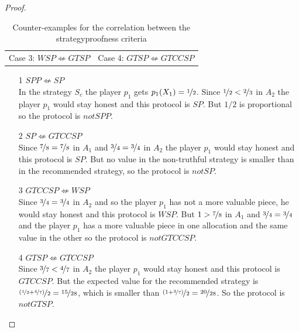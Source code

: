 \begin{proof}
\begin{table}[htb]
\begin{tabular}{cc}
Case 3: $WSP \not\Leftarrow GTSP$& Case 4: $GTSP \not\Leftarrow GTCCSP$
\end{tabular}
\caption{Counter-examples for the correlation between the strategyproofness criteria}\label{234}
\end{table}
\newpage
\begin{enumerate}
\item[1] $SPP \not\Leftarrow SP$\\
In the strategy $S_c$ the player $p_1$ gets $p_1(X_1)=\nicefrac{1}{2}$. Since $\nicefrac{1}{2} < \nicefrac{2}{3}$ in $A_2$ the player $p_1$ would stay honest and this protocol is $SP$. But $1/2$ is proportional so the protocol is $notSPP$. 
\item[2] $SP \not\Leftarrow GTCCSP$\\Since $\nicefrac{7}{8} = \nicefrac{7}{8}$ in $A_1$ and $\nicefrac{3}{4} = \nicefrac{3}{4}$ in $A_2$ the player $p_1$ would stay honest and this protocol is $SP$. But no value in the non-truthful strategy is smaller than in the recommended strategy, so the protocol is $notSP$.
\item[3] $GTCCSP \not\Leftarrow WSP$\\
Since $\nicefrac{3}{4} = \nicefrac{3}{4}$ in $A_2$ and so the player $p_1$ has not a more valuable piece, he would stay honest and this protocol is $WSP$. But $1 > \nicefrac{7}{8}$ in $A_1$ and $\nicefrac{3}{4} = \nicefrac{3}{4}$ and the player $p_1$ has a more valuable piece in one allocation and the same value in the other so the protocol is $notGTCCSP$.
\item[4] $GTSP \not\Leftarrow GTCCSP$\\
Since $\nicefrac{3}{7} < \nicefrac{4}{7}$ in $A_2$ the player $p_1$ would stay honest and this protocol is $GTCCSP$. But the expected value for the recommended strategy is $\nicefrac{(\nicefrac{1}{2}+\nicefrac{4}{7})}{2}=\nicefrac{15}{28}$, which is smaller than $\nicefrac{(1+\nicefrac{3}{7})}{2}=\nicefrac{20}{28}$. So the protocol is $notGTSP$. 
\end{enumerate}
\end{proof}


